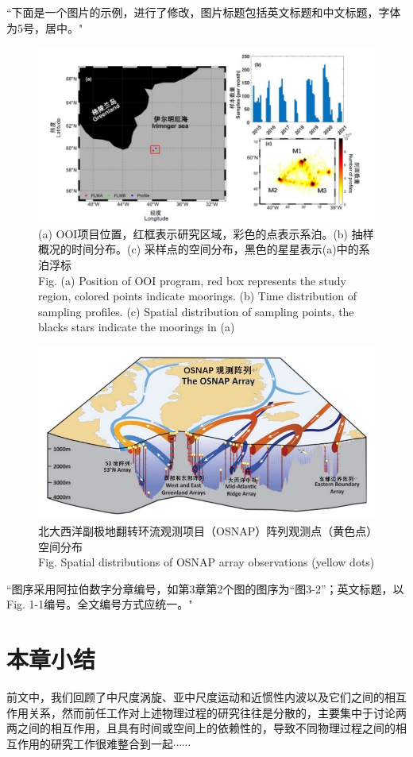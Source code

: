 {\color{red}``下面是一个图片的示例，进行了修改，图片标题包括英文标题和中文标题，字体为5号，居中。"}

\begin{figure}[htbp]
    \centering
    \includegraphics[width=0.8\linewidth]{img/fig_1_1_study_area.jpg}
    \caption{\centering (a) OOI项目位置，红框表示研究区域，彩色的点表示系泊。(b) 抽样概况的时间分布。(c) 采样点的空间分布，黑色的星星表示(a)中的系泊浮标\\ 
    Fig. \thefigure (a) Position of OOI program, red box represents the study region, colored points indicate moorings. (b) Time distribution of sampling profiles. (c) Spatial distribution of sampling points, the blacks stars indicate the moorings in (a)}
    \label{fig:enter-label}
\end{figure}

\begin{figure}[htbp]
    \centering
    \includegraphics[width=0.5\linewidth]{img/fig_1_2_OSNAP.jpg}
    \caption{\centering 北大西洋副极地翻转环流观测项目（OSNAP）阵列观测点（黄色点）空间分布 \\
    Fig. \thefigure Spatial distributions of OSNAP array observations (yellow dots)}
    \label{fig:enter-label}
\end{figure}

{\color{red}``图序采用阿拉伯数字分章编号，如第3章第2个图的图序为“图3-2”；英文标题，以Fig. 1-1编号。全文编号方式应统一。"}

\section{本章小结}

前文中，我们回顾了中尺度涡旋、亚中尺度运动和近惯性内波以及它们之间的相互作用关系，然而前任工作对上述物理过程的研究往往是分散的，主要集中于讨论两两之间的相互作用，且具有时间或空间上的依赖性的，导致不同物理过程之间的相互作用的研究工作很难整合到一起$\cdots\cdots$
